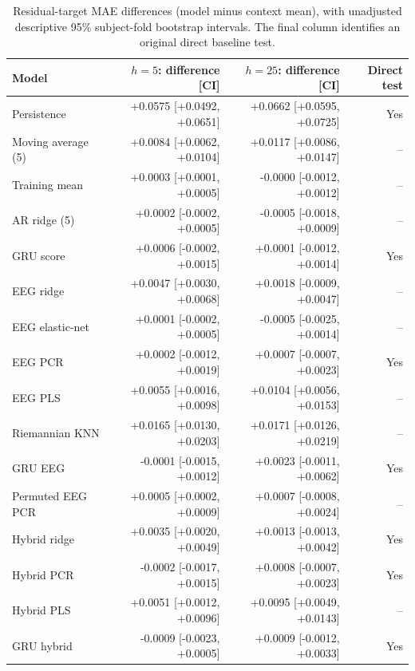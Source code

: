 \begin{table}[!ht]
\centering
\small
\setlength{\tabcolsep}{5pt}
\renewcommand{\arraystretch}{1.1}
\caption{Residual-target MAE differences (model minus context mean), with unadjusted descriptive 95\% subject-fold bootstrap intervals. The final column identifies an original direct baseline test.}
\label{tab:supp_deltas_residual}
\begin{tabular}{lrrr}
\toprule
Model & $h=5$: difference [CI] & $h=25$: difference [CI] & Direct test \\
\midrule
Persistence & +0.0575 [+0.0492, +0.0651] & +0.0662 [+0.0595, +0.0725] & Yes \\
Moving average (5) & +0.0084 [+0.0062, +0.0104] & +0.0117 [+0.0086, +0.0147] & -- \\
Training mean & +0.0003 [+0.0001, +0.0005] & -0.0000 [-0.0012, +0.0012] & -- \\
AR ridge (5) & +0.0002 [-0.0002, +0.0005] & -0.0005 [-0.0018, +0.0009] & -- \\
GRU score & +0.0006 [-0.0002, +0.0015] & +0.0001 [-0.0012, +0.0014] & Yes \\
EEG ridge & +0.0047 [+0.0030, +0.0068] & +0.0018 [-0.0009, +0.0047] & -- \\
EEG elastic-net & +0.0001 [-0.0002, +0.0005] & -0.0005 [-0.0025, +0.0014] & -- \\
EEG PCR & +0.0002 [-0.0012, +0.0019] & +0.0007 [-0.0007, +0.0023] & Yes \\
EEG PLS & +0.0055 [+0.0016, +0.0098] & +0.0104 [+0.0056, +0.0153] & -- \\
Riemannian KNN & +0.0165 [+0.0130, +0.0203] & +0.0171 [+0.0126, +0.0219] & -- \\
GRU EEG & -0.0001 [-0.0015, +0.0012] & +0.0023 [-0.0011, +0.0062] & Yes \\
Permuted EEG PCR & +0.0005 [+0.0002, +0.0009] & +0.0007 [-0.0008, +0.0024] & -- \\
Hybrid ridge & +0.0035 [+0.0020, +0.0049] & +0.0013 [-0.0013, +0.0042] & Yes \\
Hybrid PCR & -0.0002 [-0.0017, +0.0015] & +0.0008 [-0.0007, +0.0023] & Yes \\
Hybrid PLS & +0.0051 [+0.0012, +0.0096] & +0.0095 [+0.0049, +0.0143] & -- \\
GRU hybrid & -0.0009 [-0.0023, +0.0005] & +0.0009 [-0.0012, +0.0033] & Yes \\
\bottomrule
\end{tabular}
\end{table}
